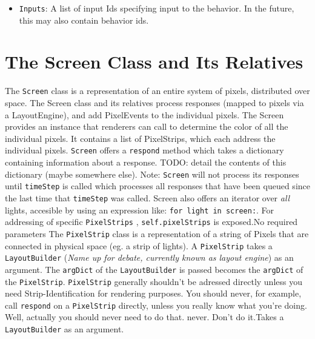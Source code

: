 \documentclass{article}
\begin{document}
{\begin{itemize}
    \item \texttt{Inputs}: A list of input Ids specifying input to the
        behavior.  In the future, this may also contain behavior ids.
\end{itemize}}
\section{The Screen Class and Its Relatives}
{The \texttt{Screen} class is a representation of an entire system of pixels,
    distributed over space.  The Screen class and its relatives process
        responses (mapped to pixels via a LayoutEngine), and add PixelEvents
        to the individual pixels.  The Screen provides an instance that
        renderers can call to determine the color of all the individual pixels. It contains a list of PixelStrips, which each
        address the individual pixels.  \texttt{Screen} offers a
        \texttt{respond} method which takes a dictionary containing information
        about a response.  TODO: detail the contents of this dictionary (maybe
                somewhere else).  Note: \texttt{Screen} will not process its
        responses until \texttt{timeStep} is called which processes all responses that
        have been queued since the last time that \texttt{timeStep} was
        called.  Screen also offers an iterator over \textit{all} lights,
    accesible by using an expression like: \texttt{for light in screen:}.  For
        addressing of specific \texttt{PixelStrips} , \texttt{self.pixelStrips}
    is exposed.}{No required parameters}
{The \texttt{PixelStrip} class is a representation of a string of Pixels that are
    connected in physical space (eg. a strip of lights).  A \texttt{PixelStrip} takes a
        \texttt{LayoutBuilder} (\textit{Name up for debate, currently known as layout
            engine}) as an argument.  The \texttt{argDict} of the
        \texttt{LayoutBuilder} is
        passed becomes the \texttt{argDict} of the \texttt{PixelStrip}.
        \texttt{PixelStrip} generally shouldn't be
        adressed directly unless you need Strip-Identification for rendering
        purposes.  You should never, for example, call \texttt{respond} on a
        \texttt{PixelStrip}
        directly, unless you really know what you're doing.  Well, actually you
            should never need to do that.
        never.  Don't do it.}{Takes a \texttt{LayoutBuilder} as an argument.}
\end{document}
